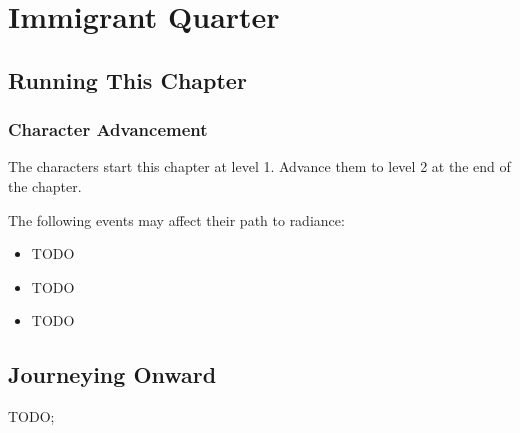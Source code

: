 \chapter{Immigrant Quarter}
\label{chap:chapterImmigrants}

\setcounter{section}{-1}
\section{Running This Chapter}

\lipsum[1][1]

\lipsum[1][2]

\subsection{Character Advancement}

The characters start this chapter at level 1. Advance them to level 2 at the end of the chapter.

The following events may affect their path to radiance:
\begin{itemize}
	\item TODO
	\item TODO
	\item TODO
\end{itemize}





\section{Journeying Onward}

TODO; \lipsum[1][1]

